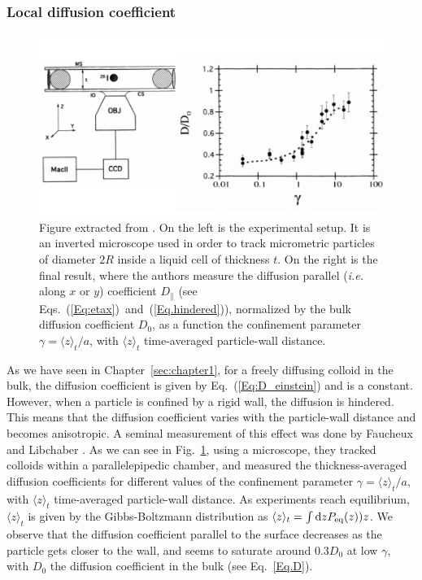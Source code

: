 \newpage

\subsubsection{Local diffusion coefficient}
\label{sec:diff}
\begin{figure}
	\centering
	\includegraphics{02_body/chapter1/image/libchaber.pdf}
	\caption{Figure extracted from \cite{faucheux_confined_1994}. On the left is the experimental setup. It is an inverted microscope used in order to track micrometric particles of diameter $2R$ inside a liquid cell of thickness $t$. On the right is the final result, where the authors measure the diffusion parallel (\textit{i.e.} along $x$ or $y$) coefficient $D_\parallel$ (see Eqs.~(\ref{Eq:etax})~and~(\ref{Eq.hindered})), normalized by the bulk diffusion coefficient $D_0$, as a function the confinement parameter $\gamma = \langle z \rangle_t/a$, with $\langle z \rangle_t$ time-averaged particle-wall distance.}
	\label{fig:libchaber}
\end{figure}


As we have seen in Chapter~\ref{sec:chapter1}, for a freely diffusing colloid in the bulk, the diffusion coefficient is given by Eq.~(\ref{Eq:D_einstein}) and is a constant. However, when a particle is confined by a rigid wall, the diffusion is hindered. This means that the diffusion coefficient varies with the particle-wall distance and becomes anisotropic. A seminal measurement of this effect was done by Faucheux and Libchaber \cite{faucheux_confined_1994}. As we can see in Fig.~\ref{fig:libchaber}, using a microscope, they tracked colloids within a parallelepipedic chamber, and measured the thickness-averaged diffusion coefficients for different values of the confinement parameter $\gamma = \langle z\rangle_t / a$, with $\langle z \rangle_t$ time-averaged particle-wall distance. As experiments reach equilibrium, $\langle z \rangle_t$ is given by the Gibbs-Boltzmann distribution as $\langle z \rangle_t = \int \textnormal{d}zP_\mathrm{eq}(z))z$. We observe that the diffusion coefficient parallel to the surface decreases as the particle gets closer to the wall, and seems to saturate around $0.3D_0$ at low $\gamma$, with $D_0$ the diffusion coefficient in the bulk (see Eq.~\ref{Eq.D}). 
\newpage

